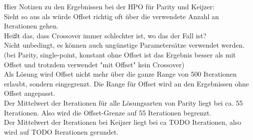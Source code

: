 Hier Notizen zu den Ergebnissen bei der HPO für Parity und Keijzer:\\
Sieht so aus als würde Offset richtig oft über die verwendete Anzahl an Iterationen gehen.\\
Heißt das, dass Crossover immer schlechter ist, wo das der Fall ist?\\
Nicht unbedingt, es können auch ungünstige Parametersätze verwendet werden. (bei Parity, single-point, konstant ohne Offset ist das Ergebnis besser als mit Offset und trotzdem verwendet "mit Offset" kein Crossover)\\
Als Lösung wird Offset nicht mehr über die ganze Range von 500 Iterationen erlaubt, sondern eingegrenzt. Die Range für Offset wird an den Ergebnissen ohne Offset angepasst.\\
Der Mittelwert der Iterationen für alle Lösungsarten von Parity liegt bei ca. 55 Iterationen. Also wird die Offset-Grenze auf 55 Iterationen begrenzt.\\
Der Mittelwert der Iterationen bei Keijzer liegt bei ca TODO Iterationen, also wird auf TODO Iterationen gerundet.
